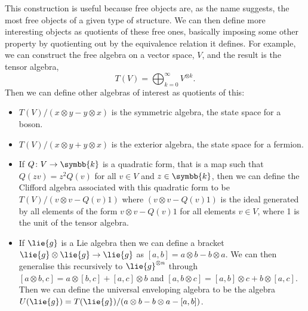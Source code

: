 \documentclass[fleqn]{NotesClass}
\renewcommand{\field}{\symbb{k}}
\begin{document}
\begin{appendices}
        This construction is useful because free objects are, as the name suggests, the most free objects of a given type of structure.
        We can then define more interesting objects as quotients of these free ones, basically imposing some other property by quotienting out by the equivalence relation it defines.
        For example, we can construct the free algebra on a vector space, \(V\), and the result is the tensor algebra,
        \begin{equation}
            T(V) = \bigoplus_{k=0}^{\infty} V^{\otimes k}.
        \end{equation}
        Then we can define other algebras of interest as quotients of this:
        \begin{itemize}
            \item \(T(V)/(x \otimes y - y \otimes x)\) is the symmetric algebra, the state space for a boson.
            \item \(T(V) / (x \otimes y + y \otimes x)\) is the exterior algebra, the state space for a fermion.
            \item If \(Q\colon V \to \field\) is a quadratic form, that is a map such that \(Q(zv) = z^2Q(v)\) for all \(v \in V\) and \(z \in \field\), then we can define the Clifford algebra associated with this quadratic form to be \(T(V) / (v \otimes v - Q(v)1)\) where \((v \otimes v - Q(v)1)\) is the ideal generated by all elements of the form \(v \otimes v - Q(v)1\) for all elements \(v \in V\), where 1 is the unit of the tensor algebra.
            \item If \(\lie{g}\) is a Lie algebra then we can define a bracket \(\lie{g} \otimes \lie{g} \to \lie{g}\) as \([a, b] = a \otimes b - b \otimes a\).
            We can then generalise this recursively to \(\lie{g}^{\otimes n}\) through \([a \otimes b, c] = a\otimes [b, c] + [a, c] \otimes b\) and \([a, b \otimes c] = [a, b] \otimes c + b \otimes [a, c]\).
            Then we can define the universal enveloping algebra to be the algebra \(U(\lie{g}) = T(\lie{g}) / (a \otimes b - b \otimes a - [a, b])\).
        \end{itemize}
        
    \end{appendices}
    
    \backmatter
    \printbibliography
    \printindex
\end{document}
